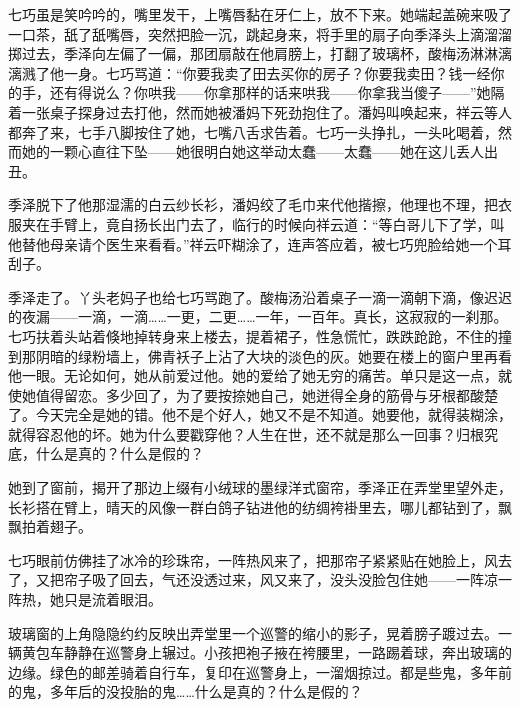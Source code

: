 \par 七巧虽是笑吟吟的，嘴里发干，上嘴唇黏在牙仁上，放不下来。她端起盖碗来吸了一口茶，舐了舐嘴唇，突然把脸一沉，跳起身来，将手里的扇子向季泽头上滴溜溜掷过去，季泽向左偏了一偏，那团扇敲在他肩膀上，打翻了玻璃杯，酸梅汤淋淋漓漓溅了他一身。七巧骂道：“你要我卖了田去买你的房子？你要我卖田？钱一经你的手，还有得说么？你哄我——你拿那样的话来哄我——你拿我当傻子——”她隔着一张桌子探身过去打他，然而她被潘妈下死劲抱住了。潘妈叫唤起来，祥云等人都奔了来，七手八脚按住了她，七嘴八舌求告着。七巧一头挣扎，一头叱喝着，然而她的一颗心直往下坠——她很明白她这举动太蠢——太蠢——她在这儿丢人出丑。
\par 季泽脱下了他那湿濡的白云纱长衫，潘妈绞了毛巾来代他揩擦，他理也不理，把衣服夹在手臂上，竟自扬长出门去了，临行的时候向祥云道：“等白哥儿下了学，叫他替他母亲请个医生来看看。”祥云吓糊涂了，连声答应着，被七巧兜脸给她一个耳刮子。
\par 季泽走了。丫头老妈子也给七巧骂跑了。酸梅汤沿着桌子一滴一滴朝下滴，像迟迟的夜漏——一滴，一滴……一更，二更……一年，一百年。真长，这寂寂的一刹那。七巧扶着头站着倏地掉转身来上楼去，提着裙子，性急慌忙，跌跌跄跄，不住的撞到那阴暗的绿粉墙上，佛青袄子上沾了大块的淡色的灰。她要在楼上的窗户里再看他一眼。无论如何，她从前爱过他。她的爱给了她无穷的痛苦。单只是这一点，就使她值得留恋。多少回了，为了要按捺她自己，她迸得全身的筋骨与牙根都酸楚了。今天完全是她的错。他不是个好人，她又不是不知道。她要他，就得装糊涂，就得容忍他的坏。她为什么要戳穿他？人生在世，还不就是那么一回事？归根究底，什么是真的？什么是假的？
\par 她到了窗前，揭开了那边上缀有小绒球的墨绿洋式窗帘，季泽正在弄堂里望外走，长衫搭在臂上，晴天的风像一群白鸽子钻进他的纺绸袴褂里去，哪儿都钻到了，飘飘拍着翅子。
\par 七巧眼前仿佛挂了冰冷的珍珠帘，一阵热风来了，把那帘子紧紧贴在她脸上，风去了，又把帘子吸了回去，气还没透过来，风又来了，没头没脸包住她——一阵凉一阵热，她只是流着眼泪。
\par 玻璃窗的上角隐隐约约反映出弄堂里一个巡警的缩小的影子，晃着膀子踱过去。一辆黄包车静静在巡警身上辗过。小孩把袍子掖在袴腰里，一路踢着球，奔出玻璃的边缘。绿色的邮差骑着自行车，复印在巡警身上，一溜烟掠过。都是些鬼，多年前的鬼，多年后的没投胎的鬼……什么是真的？什么是假的？

